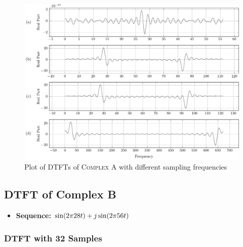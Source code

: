 \documentclass[../../course]{subfiles}
\begin{document}
\vfill

\begin{figure} [H]
    \centering
     {
        \includegraphics[height = 0.8\textheight] {tikzpics/plotDtftComplexA64.pdf}
    }
     {Plot of \textsc{DTFT}s of \textsc{Complex A} with different sampling frequencies}
    \label{plt:dtftComplexA}
\end{figure}

\pagebreak

\subsection{DTFT of Complex B} \label{ssec:dtftCplxB}

\begin{itemize} [label=]

    \item \textbf{Sequence:} $\sin(2 \pi 28 t) + j \sin(2 \pi 56 t)$

\end{itemize}

\subsubsection{DTFT with 32 Samples}
\end{document}
